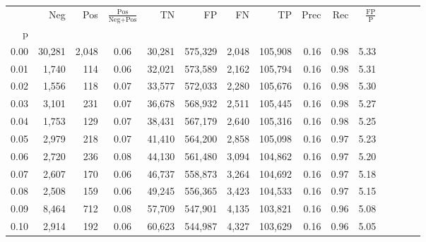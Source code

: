 \begin{tabular}{rrrcrrrrrrrrrrr}
\toprule
{} &     Neg &    Pos & $\frac{\text{Pos}}{\text{Neg}+\text{Pos}}$ &       TN &       FP &       FN &       TP &  Prec &   Rec & $\frac{\text{FP}}{\text{P}}$ \\
p    &         &        &                                            &          &          &          &          &       &       &                              \\
\midrule
0.00 &  30,281 &  2,048 &                                       0.06 &   30,281 &  575,329 &    2,048 &  105,908 &  0.16 &  0.98 &                         5.33 \\
0.01 &   1,740 &    114 &                                       0.06 &   32,021 &  573,589 &    2,162 &  105,794 &  0.16 &  0.98 &                         5.31 \\
0.02 &   1,556 &    118 &                                       0.07 &   33,577 &  572,033 &    2,280 &  105,676 &  0.16 &  0.98 &                         5.30 \\
0.03 &   3,101 &    231 &                                       0.07 &   36,678 &  568,932 &    2,511 &  105,445 &  0.16 &  0.98 &                         5.27 \\
0.04 &   1,753 &    129 &                                       0.07 &   38,431 &  567,179 &    2,640 &  105,316 &  0.16 &  0.98 &                         5.25 \\
0.05 &   2,979 &    218 &                                       0.07 &   41,410 &  564,200 &    2,858 &  105,098 &  0.16 &  0.97 &                         5.23 \\
0.06 &   2,720 &    236 &                                       0.08 &   44,130 &  561,480 &    3,094 &  104,862 &  0.16 &  0.97 &                         5.20 \\
0.07 &   2,607 &    170 &                                       0.06 &   46,737 &  558,873 &    3,264 &  104,692 &  0.16 &  0.97 &                         5.18 \\
0.08 &   2,508 &    159 &                                       0.06 &   49,245 &  556,365 &    3,423 &  104,533 &  0.16 &  0.97 &                         5.15 \\
0.09 &   8,464 &    712 &                                       0.08 &   57,709 &  547,901 &    4,135 &  103,821 &  0.16 &  0.96 &                         5.08 \\
0.10 &   2,914 &    192 &                                       0.06 &   60,623 &  544,987 &    4,327 &  103,629 &  0.16 &  0.96 &                         5.05 \\

\end{tabular}
